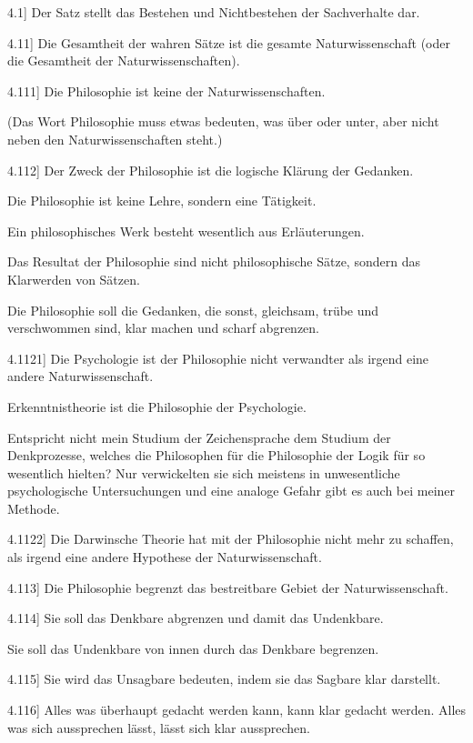 \documentclass[12pt,oneside]{book}[2007/10/19]
\newcommand{\PropERef}[1]{\hyperref[PropE:#1]{#1}}
\newcommand{\PropositionG}[2]{%
  \item[\phantomsection\label{PropG:#1}\PropERef{#1}] #2%
}
\begin{document}
\begin{propositions}
\PropositionG{4.1}
{Der Satz stellt das Bestehen und Nichtbestehen
der Sachverhalte dar.}


\PropositionG{4.11}
{Die Gesamtheit der wahren Sätze ist die
gesamte Naturwissenschaft (oder die Gesamtheit
der Naturwissenschaften).}


\PropositionG{4.111}
{Die Philosophie ist keine der Naturwissenschaften.

(Das Wort \glqq{}Philosophie\grqq{} muss etwas bedeuten,
was über oder unter, aber nicht neben den Naturwissenschaften
steht.)}


\PropositionG{4.112}
{Der Zweck der Philosophie ist die logische
Klärung der Gedanken.

Die Philosophie ist keine Lehre, sondern eine
Tätigkeit.

Ein philosophisches Werk besteht wesentlich
aus Erläuterungen.

Das Resultat der Philosophie sind nicht \glqq{}philosophische
Sätze\grqq{}, sondern das Klarwerden von
Sätzen.

Die Philosophie soll die Gedanken, die sonst,
gleichsam, trübe und verschwommen sind, klar
machen und scharf abgrenzen.}


\PropositionG{4.1121}
{Die Psychologie ist der Philosophie nicht verwandter
als irgend eine andere Naturwissenschaft.

Erkenntnistheorie ist die Philosophie der
Psychologie.

Entspricht nicht mein Studium der Zeichensprache
dem Studium der Denkprozesse, welches
die Philosophen für die Philosophie der Logik für
so wesentlich hielten? Nur verwickelten sie sich
meistens in unwesentliche psychologische Untersuchungen
und eine analoge Gefahr gibt es auch
bei meiner Methode.}


\PropositionG{4.1122}
{Die Darwinsche Theorie hat mit der Philosophie
nicht mehr zu schaffen, als irgend eine andere
Hypothese der Naturwissenschaft.}


\PropositionG{4.113}
{Die Philosophie begrenzt das bestreitbare
Gebiet der Naturwissenschaft.}


\PropositionG{4.114}
{Sie soll das Denkbare abgrenzen und damit das
Undenkbare.

Sie soll das Undenkbare von innen durch das
Denkbare begrenzen.}


\PropositionG{4.115}
{Sie wird das Unsagbare bedeuten, indem sie
das Sagbare klar darstellt.}


\PropositionG{4.116}
{Alles was überhaupt gedacht werden kann,
kann klar gedacht werden. Alles was sich aussprechen
lässt, lässt sich klar aussprechen.}



\end{propositions}
\end{document}
